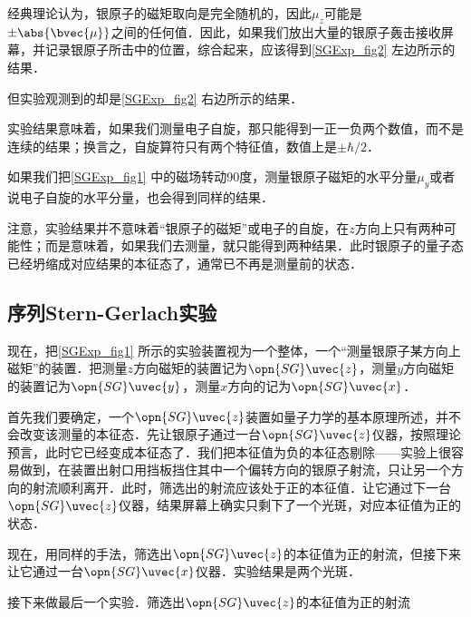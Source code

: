 经典理论认为，银原子的磁矩取向是完全随机的，因此$\mu_z$可能是$\pm\abs{\bvec{\mu}}$之间的任何值．因此，如果我们放出大量的银原子轰击接收屏幕，并记录银原子所击中的位置，综合起来，应该得到\autoref{SGExp_fig2} 左边所示的结果．

但实验观测到的却是\autoref{SGExp_fig2} 右边所示的结果．


实验结果意味着，如果我们测量电子自旋，那只能得到一正一负两个数值，而不是连续的结果；换言之，自旋算符只有两个特征值，数值上是$\pm\hbar/2$．


如果我们把\autoref{SGExp_fig1} 中的磁场转动90度，测量银原子磁矩的水平分量$\mu_y$或者说电子自旋的水平分量，也会得到同样的结果．



注意，实验结果并不意味着“银原子的磁矩”或电子的自旋，在$z$方向上只有两种可能性；而是意味着，如果我们去测量，就只能得到两种结果．此时银原子的量子态已经坍缩成对应结果的本征态了，通常已不再是测量前的状态．



\subsection{序列Stern-Gerlach实验}


现在，把\autoref{SGExp_fig1} 所示的实验装置视为一个整体，一个“测量银原子某方向上磁矩”的装置．把测量$z$方向磁矩的装置记为$\opn{SG}\uvec{z}$，测量$y$方向磁矩的装置记为$\opn{SG}\uvec{y}$，测量$x$方向的记为$\opn{SG}\uvec{x}$．

首先我们要确定，一个$\opn{SG}\uvec{z}$装置如量子力学的基本原理所述，并不会改变该测量的本征态．先让银原子通过一台$\opn{SG}\uvec{z}$仪器，按照理论预言，此时它已经变成本征态了．我们把本征值为负的本征态剔除——实验上很容易做到，在装置出射口用挡板挡住其中一个偏转方向的银原子射流，只让另一个方向的射流顺利离开．此时，筛选出的射流应该处于正的本征值．让它通过下一台$\opn{SG}\uvec{z}$仪器，结果屏幕上确实只剩下了一个光斑，对应本征值为正的状态．

现在，用同样的手法，筛选出$\opn{SG}\uvec{z}$的本征值为正的射流，但接下来让它通过一台$\opn{SG}\uvec{x}$仪器．实验结果是两个光斑．

接下来做最后一个实验．筛选出$\opn{SG}\uvec{z}$的本征值为正的射流





















